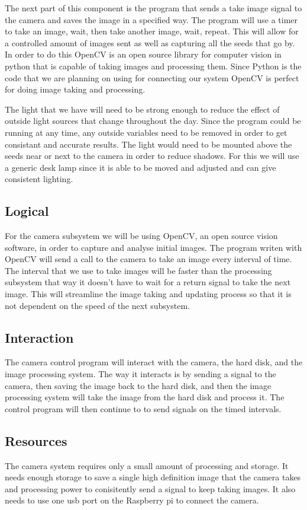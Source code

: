 The next part of this component is the program that sends a take image signal to the camera and saves the image in a specified way. The program will use a timer to take an image, wait, then take another image, wait, repeat. This will allow for a controlled amount of images sent as well as capturing all the seeds that go by. In order to do this OpenCV is an open source library for computer vision in python that is capable of taking images and processing them. Since Python is the code that we are planning on using for connecting our system OpenCV is perfect for doing image taking and processing. 

The light that we have will need to be strong enough to reduce the effect of outside light sources that change throughout the day. Since the program could be running at any time, any outside variables need to be removed in order to get consistant and accurate results. The light would need to be mounted above the seeds near or next to the camera in order to reduce shadows. For this we will use a generic desk lamp since it is able to be moved and adjusted and can give consistent lighting.

\subsection{Logical}
For the camera subsystem we will be using OpenCV, an open source vision software, in order to capture and analyse initial images. The program writen with OpenCV will send a call to the camera to take an image every interval of time. The interval that we use to take images will be faster than the processing subsystem that way it doesn't have to wait for a return signal to take the next image. This will streamline the image taking and updating process so that it is not dependent on the speed of the next subsystem.

\subsection{Interaction}
The camera control program will interact with the camera, the hard disk, and the image processing system. The way it interacts is by sending a signal to the camera, then saving the image back to the hard disk, and then the image processing system will take the image from the hard disk and process it. The control program will then continue to to send signals on the timed intervals.

\subsection{Resources}
The camera system requires only a small amount of processing and storage. It needs enough storage to save a single high definition image that the camera takes and processing power to conisitently send a signal to keep taking images. It also needs to use one usb port on the Raspberry pi to connect the camera.
